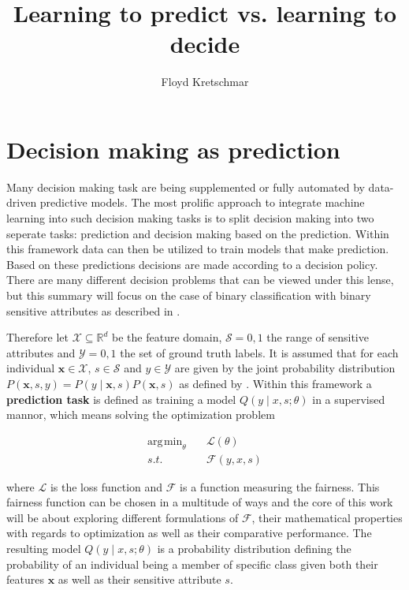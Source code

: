 \documentclass[
	a4paper,
	11pt
	]{article}
\title{Learning to predict vs. learning to decide}
\author{Floyd Kretschmar}
\DeclareMathOperator*{\argmin}{\arg\!\min}
\begin{document}
\maketitle

\section{Decision making as prediction}
\label{sec:decision_as_pred}
Many decision making task are being supplemented or fully automated by data-driven predictive models. The most prolific approach to integrate machine learning into such decision making tasks is to split decision making into two seperate tasks: prediction and decision making based on the prediction. Within this framework data can then be utilized to train models that make prediction. Based on these predictions decisions are made according to a decision policy. There are many different decision problems that can be viewed under this lense, but this summary will focus on the case of binary classification with binary sensitive attributes as described in \cite{Kilbertus19}.

Therefore let $\mathcal{X} \subseteq \mathbb{R}^{d}$ be the feature domain, $\mathcal{S} = {0,1}$ the range of sensitive attributes and $\mathcal{Y} = {0, 1}$ the set of ground truth labels. It is assumed that for each individual $\boldsymbol{x} \in \mathcal{X}$, $s \in \mathcal{S}$ and $y \in \mathcal{Y}$ are given by the joint probability distribution $P(\boldsymbol{x}, s, y) = P(y \mid \boldsymbol{x}, s)P(\boldsymbol{x}, s)$ as defined by \cite{Kilbertus19}. Within this framework a \textbf{prediction task} is defined as training a model $Q(y \mid x, s; \theta)$ in a supervised mannor, which means solving the optimization problem 

\begin{align*}
    \argmin_{\theta} &\quad \mathcal{L}(\theta) \\
    s.t.&\quad \mathcal{F}(y, x, s)
\end{align*}

where $\mathcal{L}$ is the loss function and $\mathcal{F}$ is a function measuring the fairness. This fairness function can be chosen in a multitude of ways and the core of this work will be about exploring different formulations of $\mathcal{F}$, their mathematical properties with regards to optimization as well as their comparative performance. The resulting model $Q(y \mid x, s; \theta)$ is a probability distribution defining the probability of an individual being a member of specific class given both their features $\boldsymbol{x}$ as well as their sensitive attribute $s$.
\end{document}
